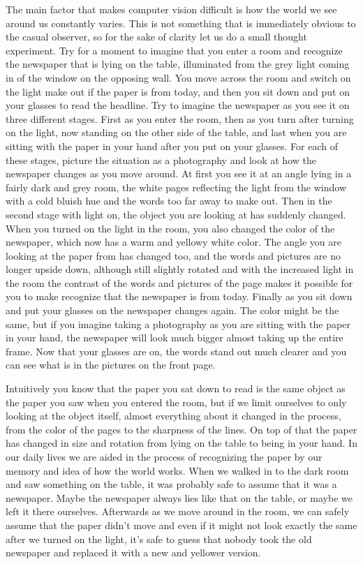The main factor that makes computer vision difficult is how the world we 
see around us constantly varies. This is not something that is 
immediately obvious to the casual observer, so for the sake of clarity 
let us do a small thought experiment. Try for a moment to imagine that 
you enter a room and recognize the newspaper that is lying on the table, 
illuminated from the grey light coming in of the window on the opposing 
wall. You move across the room and switch on the light make out if the 
paper is from today, and then you sit down and put on your glasses to 
read the headline. Try to imagine the newspaper as you see it on three 
different stages. First as you enter the room, then as you turn after 
turning on the light, now standing on the other side of the table, and 
last when you are sitting with the paper in your hand after you put on 
your glasses. For each of these stages, picture the situation as a 
photography and look at how the newspaper changes as you move around. At 
first you see it at an angle lying in a fairly dark and grey room, the 
white pages reflecting the light from the window with a cold bluish hue 
and the words too far away to make out. Then in the second stage with 
light on, the object you are looking at has suddenly changed. When you 
turned on the light in the room, you also changed the color of the 
newspaper, which now has a warm and yellowy white color.  The angle you 
are looking at the paper from has changed too, and the words and 
pictures are no longer upside down, although still slightly rotated and 
with the increased light in the room the contrast of the words and 
pictures of the page makes it possible for you to make recognize that 
the newspaper is from today. Finally as you sit down and put your 
glasses on the newspaper changes again. The color might be the same, but 
if you imagine taking a photography as you are sitting with the paper in 
your hand, the newspaper will look much bigger almost taking up the 
entire frame. Now that your glasses are on, the words stand out much 
clearer and you can see what is in the pictures on the front page.

Intuitively you know that the paper you sat down to read is the same 
object as the paper you saw when you entered the room, but if we limit 
ourselves to only looking at the object itself, almost everything about 
it changed in the process, from the color of the pages to the sharpness 
of the lines. On top of that the paper has changed in size and rotation 
from lying on the table to being in your hand. In our daily lives we are 
aided in the process of recognizing the paper by our memory and idea of 
how the world works. When we walked in to the dark room and saw 
something on the table, it was probably safe to assume that it was a 
newspaper. Maybe the newspaper always lies like that on the table, or 
maybe we left it there ourselves. Afterwards as we move around in the 
room, we can safely assume that the paper didn't move and even if it 
might not look exactly the same after we turned on the light, it's safe 
to guess that nobody took the old newspaper and replaced it with a new 
and yellower version.

